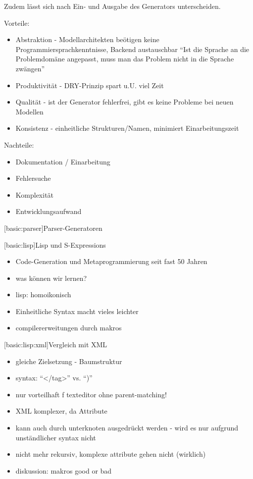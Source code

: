 \documentclass[a4paper, bibgerm]{article}
\newcommand\lsubsection{}
\newcommand\lsubsubsection{}
\begin{document}
Zudem lässt sich nach Ein- und Ausgabe des Generators unterscheiden.

Vorteile:
\begin{itemize}
\item Abstraktion - Modellarchitekten beötigen keine
  Programmiersprachkenntnisse, Backend austauschbar
``Ist die Sprache an die Problemdomäne angepasst, muss man das Problem
nicht in die Sprache zwängen''
\item Produktivität - DRY-Prinzip spart u.U. viel Zeit
\item Qualität - ist der Generator fehlerfrei, gibt es keine Probleme
  bei neuen Modellen
\item Konsistenz - einheitliche Strukturen/Namen, minimiert Einarbeitungszeit
\end{itemize}

Nachteile:
\begin{itemize}
\item Dokumentation / Einarbeitung
\item Fehlersuche
\item Komplexität
\item Entwicklungsaufwand
\end{itemize}

\lsubsection[basic:parser]{Parser-Generatoren}

\lsubsection[basic:lisp]{Lisp und S-Expressions}
\begin{itemize}
\item Code-Generation und Metaprogrammierung seit fast 50 Jahren
\item was können wir lernen?
\item lisp: homoikonisch
\item Einheitliche Syntax macht vieles leichter
\item compilererweitungen durch makros
\end{itemize}

\lsubsubsection[basic:lisp:xml]{Vergleich mit XML}

\begin{itemize}
\item gleiche Zielsetzung - Baumstruktur
\item syntax: ``</tag>'' vs. ``)''
\item nur vorteilhaft f texteditor ohne parent-matching!
\item XML komplexer, da Attribute
\item kann auch durch unterknoten ausgedrückt werden - wird es nur aufgrund
unständlicher syntax nicht
\item nicht mehr rekursiv, komplexe attribute gehen nicht (wirklich)
\item diskussion: makros good or bad
\end{itemize}
\end{document}
